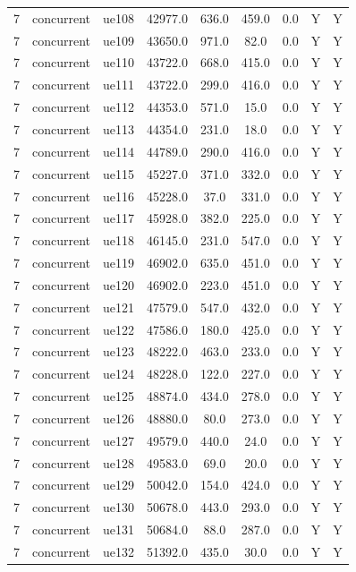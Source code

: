 \begin{table}[ht]
\begin{tabular}{|c|c|c|c|c|c|c|c|c|}
7 & concurrent & ue108 & 42977.0 & 636.0 & 459.0 & 0.0 & Y & Y \\
7 & concurrent & ue109 & 43650.0 & 971.0 & 82.0 & 0.0 & Y & Y \\
7 & concurrent & ue110 & 43722.0 & 668.0 & 415.0 & 0.0 & Y & Y \\
7 & concurrent & ue111 & 43722.0 & 299.0 & 416.0 & 0.0 & Y & Y \\
7 & concurrent & ue112 & 44353.0 & 571.0 & 15.0 & 0.0 & Y & Y \\
7 & concurrent & ue113 & 44354.0 & 231.0 & 18.0 & 0.0 & Y & Y \\
7 & concurrent & ue114 & 44789.0 & 290.0 & 416.0 & 0.0 & Y & Y \\
7 & concurrent & ue115 & 45227.0 & 371.0 & 332.0 & 0.0 & Y & Y \\
7 & concurrent & ue116 & 45228.0 & 37.0 & 331.0 & 0.0 & Y & Y \\
7 & concurrent & ue117 & 45928.0 & 382.0 & 225.0 & 0.0 & Y & Y \\
7 & concurrent & ue118 & 46145.0 & 231.0 & 547.0 & 0.0 & Y & Y \\
7 & concurrent & ue119 & 46902.0 & 635.0 & 451.0 & 0.0 & Y & Y \\
7 & concurrent & ue120 & 46902.0 & 223.0 & 451.0 & 0.0 & Y & Y \\
7 & concurrent & ue121 & 47579.0 & 547.0 & 432.0 & 0.0 & Y & Y \\
7 & concurrent & ue122 & 47586.0 & 180.0 & 425.0 & 0.0 & Y & Y \\
7 & concurrent & ue123 & 48222.0 & 463.0 & 233.0 & 0.0 & Y & Y \\
7 & concurrent & ue124 & 48228.0 & 122.0 & 227.0 & 0.0 & Y & Y \\
7 & concurrent & ue125 & 48874.0 & 434.0 & 278.0 & 0.0 & Y & Y \\
7 & concurrent & ue126 & 48880.0 & 80.0 & 273.0 & 0.0 & Y & Y \\
7 & concurrent & ue127 & 49579.0 & 440.0 & 24.0 & 0.0 & Y & Y \\
7 & concurrent & ue128 & 49583.0 & 69.0 & 20.0 & 0.0 & Y & Y \\
7 & concurrent & ue129 & 50042.0 & 154.0 & 424.0 & 0.0 & Y & Y \\
7 & concurrent & ue130 & 50678.0 & 443.0 & 293.0 & 0.0 & Y & Y \\
7 & concurrent & ue131 & 50684.0 & 88.0 & 287.0 & 0.0 & Y & Y \\
7 & concurrent & ue132 & 51392.0 & 435.0 & 30.0 & 0.0 & Y & Y \\

\end{tabular}
\end{table}
